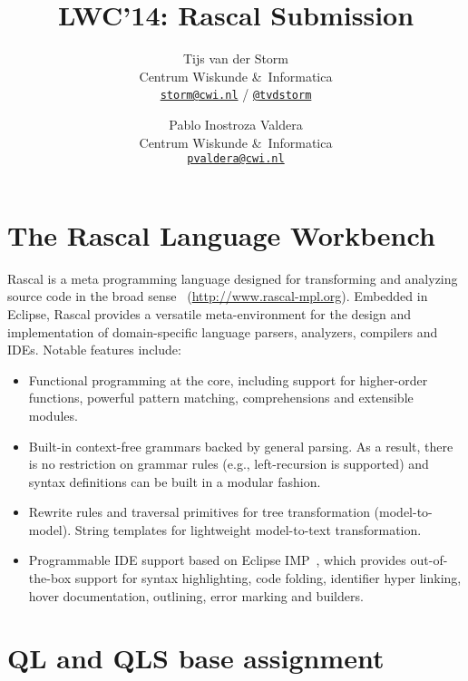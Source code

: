 \documentclass[a4paper]{article}
\begin{document}
\title{LWC'14: Rascal Submission}
\author{Tijs van der Storm \\
Centrum Wiskunde \&\ Informatica \\
\href{mailto:storm@cwi.nl}{\texttt{storm@cwi.nl}} / \href{http://twitter.com/tvdstorm}{\texttt{@tvdstorm}}
\and Pablo Inostroza Valdera\\ 
Centrum Wiskunde \&\ Informatica \\
\href{mailto:pvaldera@cwi.nl}{\texttt{pvaldera@cwi.nl}}
}
\maketitle

\section{The Rascal Language Workbench}

Rascal is a meta programming language designed for transforming and
analyzing source code in the broad sense~\cite{KlintSV09}
(\url{http://www.rascal-mpl.org}). Embedded in Eclipse, Rascal
provides a versatile meta-environment for the design and
implementation of domain-specific language parsers, analyzers,
compilers and IDEs. Notable features include:
\begin{itemize}
\item Functional programming at the core, including support for
  higher-order functions, powerful pattern matching,
  comprehensions and extensible modules.
\item Built-in context-free grammars backed by general parsing. As a
  result, there is no restriction on grammar rules (e.g.,
  left-recursion is supported) and syntax definitions can be built in
  a modular fashion.
\item Rewrite rules and traversal primitives for tree transformation
  (model-to-model). String templates for lightweight model-to-text
  transformation.
\item Programmable IDE support based on Eclipse
  IMP~\cite{CharlesFSDV09}, which provides out-of-the-box support for
  syntax highlighting, code folding, identifier hyper linking, hover
  documentation, outlining, error marking and builders. 
\end{itemize}


\section{QL and QLS base assignment}
\end{document}
